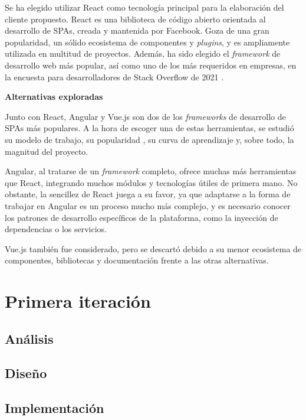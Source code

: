 \documentclass[10pt, a4paper]{aqademic}
\begin{document}
Se ha elegido utilizar React como tecnología principal para la elaboración del cliente propuesto. React es una biblioteca de código abierto orientada al desarrollo de
SPAs, creada y mantenida por Facebook. Goza de una gran popularidad, un sólido ecosistema de componentes y \textit{plugins}, y es ampliamente utilizada
en multitud de proyectos. Además, ha sido elegido el \textit{framework} de desarrollo web más popular, así como uno de los más requeridos en empresas, en la encuesta para desarrolladores de Stack Overflow de 2021 \cite{noauthor_stack_2021}.

\medskip

\textbf{Alternativas exploradas}

Junto con React, Angular y Vue.js son dos de los \textit{frameworks} de desarrollo de SPAs más populares. A la hora de escoger una de estas herramientas,
se estudió su modelo de trabajo, su popularidad \cite{potter_angular}, su curva de aprendizaje y, sobre todo, la magnitud del proyecto.

Angular, al tratarse de un \textit{framework} completo, ofrece muchas más herramientas que React, integrando muchos módulos y tecnologías útiles
de primera mano. No obstante, la sencillez de React juega a su favor, ya que adaptarse a la forma de trabajar en Angular es un proceso mucho más complejo,
y es necesario conocer los patrones de desarrollo específicos de la plataforma, como la inyección de dependencias o los servicios.

Vue.js también fue considerado, pero se descartó debido a su menor ecosistema de componentes, bibliotecas y documentación frente a las otras alternativas.




\section{Primera iteración}

\subsection{Análisis}

\subsection{Diseño}

\subsection{Implementación}
\end{document}
